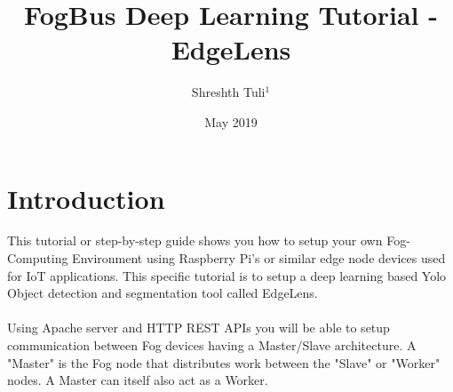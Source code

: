 \documentclass{article}
\title{FogBus Deep Learning Tutorial - EdgeLens}
\author{Shreshth Tuli$^{1}$}
\date{May 2019}
\begin{document}
\maketitle

\section{Introduction}
This tutorial or step-by-step guide shows you how to setup your own Fog-Computing Environment using Raspberry Pi's or similar edge node devices used for IoT applications. This specific tutorial is to setup a deep learning based Yolo Object detection and segmentation tool called EdgeLens.\\ \\
Using Apache server and HTTP REST APIs you will be able to setup communication between Fog devices having a Master/Slave architecture. A "Master" is the Fog node that distributes work between the "Slave" or "Worker" nodes. A Master can itself also act as a Worker. 
\end{document}
